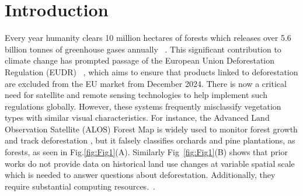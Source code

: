 \section{Introduction}
Every year humanity clears 10 million hectares of forests which releases over 5.6 billion tonnes of greenhouse gases annually ~\cite{UNEP2024}. This significant contribution to climate change has prompted passage of the European Union Deforestation Regulation (EUDR) ~\cite{EUDR}, which aims to ensure that products linked to deforestation are excluded from the EU market from December 2024. There is now a critical need for satellite and remote sensing technologies to help implement such regulations globally. However, these systems frequently misclassify vegetation types with similar visual characteristics. For instance, the Advanced Land Observation Satellite (ALOS) Forest Map is widely used to monitor forest growth and track deforestation \cite{ALOS}, but it falsely classifies orchards and pine plantations, as forests, as seen in Fig.\ref{fig:Fig1}(A). Similarly Fig~\ref{fig:Fig1}(B) shows that prior works do not provide data on historical land use changes at variable spatial scale which is needed to answer questions about deforestation. Additionally, they require substantial computing resources.~\cite{tseng2023lightweight, ravirathinam2024combining}.


